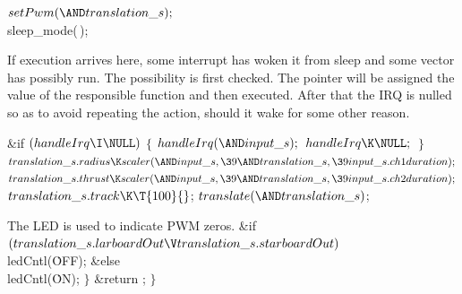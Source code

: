\Y\B$\\{setPwm}({\AND}\\{translation\_s});{}$\6
\\{sleep\_mode}(\,);\par
\fi

If execution arrives here, some interrupt has woken it from sleep and some
vector has possibly run. The possibility is first checked.
The pointer  will be assigned the value of the responsible
function and then executed.
After that the IRQ is nulled so as to avoid repeating the action, should it
wake for some other reason.


\Y\B\&{if} ${}(\\{handleIrq}\I\NULL){}$\5
${}\{{}$\1\7
${}\\{handleIrq}({\AND}\\{input\_s});{}$\6
${}\\{handleIrq}\K\NULL;{}$\6
\4${}\}{}$\2\6
${}\\{translation\_s}.\\{radius}\K\\{scaler}({\AND}\\{input\_s},\39{\AND}%
\\{translation\_s},\39\\{input\_s}.\\{ch1duration});{}$\6
${}\\{translation\_s}.\\{thrust}\K\\{scaler}({\AND}\\{input\_s},\39{\AND}%
\\{translation\_s},\39\\{input\_s}.\\{ch2duration});{}$\6
${}\\{translation\_s}.\\{track}\K\T{100}{}$;\6
${}\\{translate}({\AND}\\{translation\_s}){}$;\par
\fi

The LED is used to indicate PWM zeros.
\Y\B\&{if} ${}(\\{translation\_s}.\\{larboardOut}\V\\{translation\_s}.%
\\{starboardOut}){}$\1\5
\\{ledCntl}(\.{OFF});\2\6
\&{else}\1\5
\\{ledCntl}(\.{ON});\2\7
$\}{}$\7
\&{return} ;\7
$\}{}$\par
\fi

